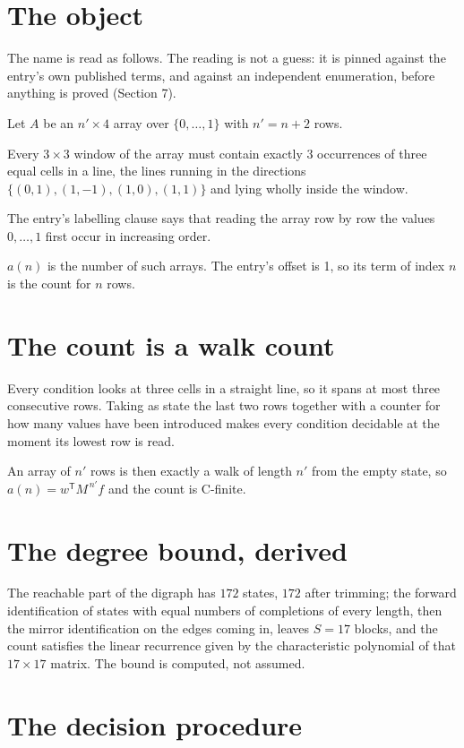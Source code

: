 \documentclass[11pt]{article}
\theoremstyle{definition}
\begin{document}
\section{The object}

The name is read as follows. The reading is not a guess: it is pinned against the entry's own published terms, and against an independent enumeration, before anything is proved (Section 7).

Let $A$ be an $n' \times 4$ array over $\{0,\dots,1\}$ with $n' = n + 2$ rows.

Every $3\times3$ window of the array must contain exactly $3$ occurrences of three equal cells in a line, the lines running in the directions $\{(0,1), (1,-1), (1,0), (1,1)\}$ and lying wholly inside the window.

The entry's labelling clause says that reading the array row by row the values $0,\dots,1$ first occur in increasing order.

$a(n)$ is the number of such arrays. The entry's offset is 1, so its term of index $n$ is the count for $n$ rows.

\section{The count is a walk count}

Every condition looks at three cells in a straight line, so it spans at most three consecutive rows. Taking as state the last two rows together with a counter for how many values have been introduced makes every condition decidable at the moment its lowest row is read.

An array of $n'$ rows is then exactly a walk of length $n'$ from the empty state, so $a(n) = w^{\mathsf T}M^{\,n'}f$ and the count is C-finite.

\section{The degree bound, derived}

The reachable part of the digraph has $172$ states, $172$ after trimming; the forward identification of states with equal numbers of completions of every length, then the mirror identification on the edges coming in, leaves $S = 17$ blocks, and the count satisfies the linear recurrence given by the characteristic polynomial of that $17\times17$ matrix. The bound is computed, not assumed.

\section{The decision procedure}
\end{document}

